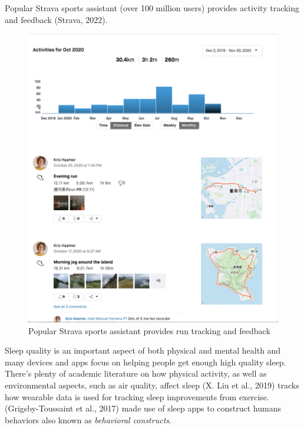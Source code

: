 \documentclass[
  12pt,
  letterpaper,
  DIV=11,
  numbers=noendperiod]{scrartcl}
\begin{document}
Popular Strava sports assistant (over 100 million users) provides
activity tracking and feedback (Strava, 2022).

\begin{figure}[H]

{\centering \includegraphics[width=1\linewidth,height=\textheight,keepaspectratio]{./images/design/strava.png}

}

\caption{Popular Strava sports assistant provides run tracking and
feedback}

\end{figure}%

Sleep quality is an important aspect of both physical and mental health
and many devices and apps focus on helping people get enough high
quality sleep. There's plenty of academic literature on how physical
activity, as well as environmental aspects, such as air quality, affect
sleep (X. Liu et al., 2019) tracks how wearable data is used for
tracking sleep improvements from exercise. (Grigsby-Toussaint et al.,
2017) made use of sleep apps to construct humans behaviors also known as
\emph{behavioral constructs}.
\end{document}
